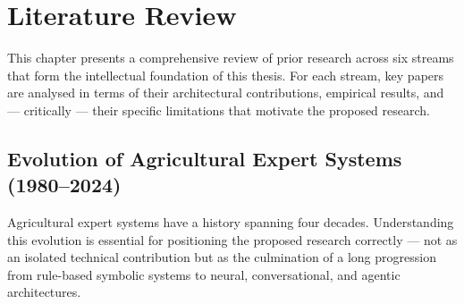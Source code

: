 \documentclass[12pt,a4paper]{article}
\begin{document}
\newpage
\section{Literature Review}

This chapter presents a comprehensive review of prior research across six streams that form the intellectual foundation of this thesis. For each stream, key papers are analysed in terms of their architectural contributions, empirical results, and --- critically --- their specific limitations that motivate the proposed research.

\subsection{Evolution of Agricultural Expert Systems (1980--2024)}
Agricultural expert systems have a history spanning four decades. Understanding this evolution is essential for positioning the proposed research correctly --- not as an isolated technical contribution but as the culmination of a long progression from rule-based symbolic systems to neural, conversational, and agentic architectures.
\end{document}
